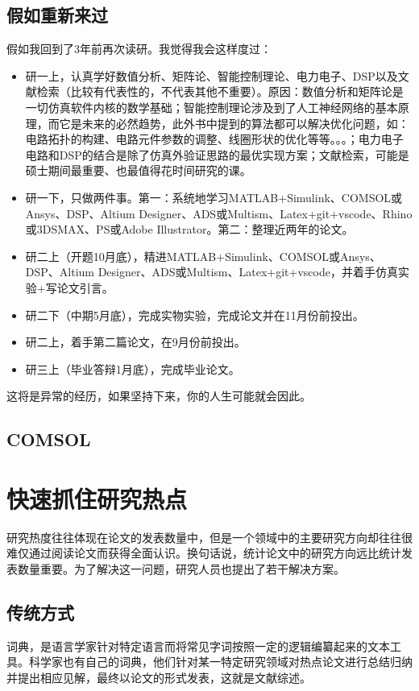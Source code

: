 \documentclass[UTF8]{ctexbook}
\begin{document}
\section{假如重新来过}
假如我回到了3年前再次读研。我觉得我会这样度过：
\begin{itemize}
	\item 研一上，认真学好数值分析、矩阵论、智能控制理论、电力电子、DSP以及文献检索（比较有代表性的，不代表其他不重要）。原因：数值分析和矩阵论是一切仿真软件内核的数学基础；智能控制理论涉及到了人工神经网络的基本原理，而它是未来的必然趋势，此外书中提到的算法都可以解决优化问题，如：电路拓扑的构建、电路元件参数的调整、线圈形状的优化等等。。。；电力电子电路和DSP的结合是除了仿真外验证思路的最优实现方案；文献检索，可能是硕士期间最重要、也最值得花时间研究的课。
	\item 研一下，只做两件事。第一：系统地学习MATLAB+Simulink、COMSOL或Ansys、DSP、Altium Designer、ADS或Multism、Latex+git+vscode、Rhino或3DSMAX、PS或Adobe Illustrator。第二：整理近两年的论文。
	\item 研二上（开题10月底），精进MATLAB+Simulink、COMSOL或Ansys、DSP、Altium Designer、ADS或Multism、Latex+git+vscode，并着手仿真实验+写论文引言。
	\item 研二下（中期5月底），完成实物实验，完成论文并在11月份前投出。
	\item 研二上，着手第二篇论文，在9月份前投出。
	\item 研三上（毕业答辩1月底），完成毕业论文。
\end{itemize}

这将是异常的经历，如果坚持下来，你的人生可能就会因此。

\section{COMSOL}


\chapter{快速抓住研究热点}
研究热度往往体现在论文的发表数量中，但是一个领域中的主要研究方向却往往很难仅通过阅读论文而获得全面认识。换句话说，统计论文中的研究方向远比统计发表数量重要。为了解决这一问题，研究人员也提出了若干解决方案。

\section{传统方式}
词典，是语言学家针对特定语言而将常见字词按照一定的逻辑编纂起来的文本工具。科学家也有自己的词典，他们针对某一特定研究领域对热点论文进行总结归纳并提出相应见解，最终以论文的形式发表，这就是文献综述。
\end{document}
